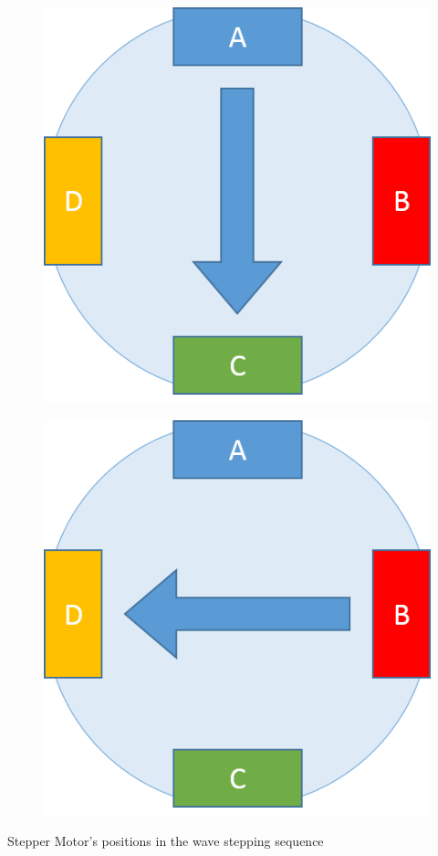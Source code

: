 \documentclass[table,10pt,red]{beamer}	%
\begin{document}
\begin{frame}
\begin{minipage}[c]{0.24\textwidth}
\begin{figure}
		\end{figure}
	\end{minipage}
	\begin{minipage}[c]{0.24\textwidth}
		\begin{figure}
			\includegraphics[width=0.9\linewidth]{step5}
		\end{figure}
	\end{minipage}
	\begin{minipage}[c]{0.24\textwidth}
		\begin{figure}
			\includegraphics[width=0.9\linewidth]{step7}
		\end{figure}
	\end{minipage}
	\begin{center}
		Stepper Motor's positions in the wave stepping sequence
	\end{center}
\end{frame}
\end{document}
